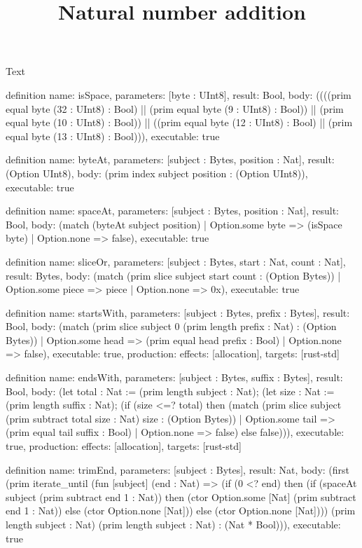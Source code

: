 \begin{lexlean}{Text}
\title{Natural number addition}
\begin{semanticmodule}
definition{
  name: isSpace,
  parameters: [byte : UInt8],
  result: Bool,
  body: ((((prim equal byte (32 : UInt8) : Bool) || (prim equal byte (9 : UInt8) : Bool)) || (prim equal byte (10 : UInt8) : Bool)) || ((prim equal byte (12 : UInt8) : Bool) || (prim equal byte (13 : UInt8) : Bool))),
  executable: true
}

definition{
  name: byteAt,
  parameters: [subject : Bytes, position : Nat],
  result: (Option UInt8),
  body: (prim index subject position : (Option UInt8)),
  executable: true
}

definition{
  name: spaceAt,
  parameters: [subject : Bytes, position : Nat],
  result: Bool,
  body: (match (byteAt subject position)
    | Option.some byte => (isSpace byte)
    | Option.none => false),
  executable: true
}

definition{
  name: sliceOr,
  parameters: [subject : Bytes, start : Nat, count : Nat],
  result: Bytes,
  body: (match (prim slice subject start count : (Option Bytes))
    | Option.some piece => piece
    | Option.none => 0x),
  executable: true
}

definition{
  name: startsWith,
  parameters: [subject : Bytes, prefix : Bytes],
  result: Bool,
  body: (match (prim slice subject 0 (prim length prefix : Nat) : (Option Bytes))
    | Option.some head => (prim equal head prefix : Bool)
    | Option.none => false),
  executable: true,
  production: {effects: [allocation], targets: [rust-std]}
}

definition{
  name: endsWith,
  parameters: [subject : Bytes, suffix : Bytes],
  result: Bool,
  body: (let total : Nat := (prim length subject : Nat); (let size : Nat := (prim length suffix : Nat); (if (size <=? total) then (match (prim slice subject (prim subtract total size : Nat) size : (Option Bytes))
    | Option.some tail => (prim equal tail suffix : Bool)
    | Option.none => false) else false))),
  executable: true,
  production: {effects: [allocation], targets: [rust-std]}
}

definition{
  name: trimEnd,
  parameters: [subject : Bytes],
  result: Nat,
  body: (first (prim iterate_until (fun [subject] (end : Nat) => (if (0 <? end) then (if (spaceAt subject (prim subtract end 1 : Nat)) then (ctor Option.some [Nat] (prim subtract end 1 : Nat)) else (ctor Option.none [Nat])) else (ctor Option.none [Nat]))) (prim length subject : Nat) (prim length subject : Nat) : (Nat * Bool))),
  executable: true
}


\end{semanticmodule}
\end{lexlean}

